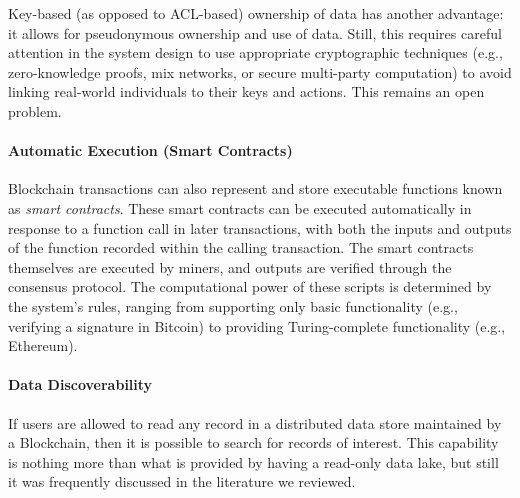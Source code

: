 Key-based (as opposed to ACL-based) ownership of data has another advantage: it allows for pseudonymous ownership and use of data.
Still, this requires careful attention in the system design to use appropriate cryptographic techniques (e.g., zero-knowledge proofs, mix networks, or secure multi-party computation) to avoid linking real-world individuals to their keys and actions. This remains an open problem.

\paragraph{Automatic Execution (Smart Contracts)}
Blockchain transactions can also represent and store executable functions known as \emph{smart contracts}.
These smart contracts can be executed automatically in response to a function call in later transactions, with both the inputs and outputs of the function recorded within the calling transaction.
The smart contracts themselves are executed by miners, and outputs are verified 
through the consensus protocol.
The computational power of these scripts is determined by the system's rules, ranging from supporting only basic functionality (e.g., verifying a signature in Bitcoin) to providing Turing-complete functionality (e.g., Ethereum).


\paragraph{Data Discoverability}
If users are allowed to read any record in a distributed data store maintained 
by a Blockchain, then it is possible to search for records of interest.
This capability is nothing more than what is provided by having a read-only data lake, but still it was frequently discussed in the literature we reviewed.
